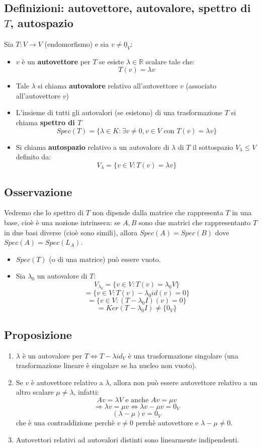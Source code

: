 \subsection{Definizioni: autovettore, autovalore, spettro di $T$, autospazio}
Sia $T:V\rightarrow V$ (endomorfismo) e sia $v\neq\underline{0}_V$:
\begin{itemize}
\item $v$ è un \textbf{autovettore} per $T$ se esiste $\lambda\in\mathbb{R}$ scalare tale che:
  \[T(v)=\lambda v\]
\item Tale $\lambda$ si chiama \textbf{autovalore} relativo all'autovettore $v$ (associato all'autovettore $v$)
\item L'insieme di tutti gli autovalori (se esistono) di una trasformazione $T$ si chiama \textbf{spettro di $T$}
  \[Spec(T)=\{\lambda\in K:\exists v\neq 0, v\in V\text{ con } T(v)=\lambda v\}\]

\item Si chiama \textbf{autospazio} relativo a un autovalore di $\lambda$ di $T$ il sottospazio $V_\lambda \leq V$ definito da:
  \[V_\lambda=\{v\in V:T(v)=\lambda v\}\]

\end{itemize}

\subsection{Osservazione}
Vedremo che lo spettro di $T$ non dipende dalla matrice che rappresenta $T$ in una base, cioè è una nozione intrinseca: se $A,B$ sono due matrici che rappresentanto $T$ in due basi diverse (cioè sono simili), allora $Spec(A)=Spec(B)$ dove $Spec(A)=Spec(L_A)$.
\begin{itemize}
\item $Spec(T)$ (o di una matrice) può essere vuoto.
\item Sia $\lambda_0$ un autovalore di $T$:
  \[V_{\lambda_0}=\{v\in V: T(v)=\lambda_0 V\}\]
  \[=\{v\in V: T(v)-\lambda_0id(v)=0\}\]
  \[=\{v\in V:(T-\lambda_0I)(v)=0\}\]
  \[=Ker(T-\lambda_0I)\neq\{0_V\}\]
\end{itemize}

\subsection{Proposizione}
\begin{enumerate}
\item $\lambda$ è un autovalore per $T\Leftrightarrow T-\lambda id_V$ è una trasformazione singolare (una trasformazione lineare è singolare se ha nucleo non vuoto).
\item Se $v$ è autovettore relativo a $\lambda$, allora non può essere autovettore relativo a un altro scalare $\mu\neq\lambda $, infatti:
  \[Av=\lambda V\text{ e anche } Av=\mu v\]
  \[\Rightarrow \lambda v=\mu v \Leftrightarrow \lambda v-\mu v=0_V\]
  \[(\lambda -\mu)v=0_V\]
  che è una contraddizione perchè $v\neq 0$ perchè autovettore e $\lambda-\mu\neq 0$.

  \item Autovettori relativi ad autovalori distinti sono linearmente indipendenti.

\end{enumerate}

